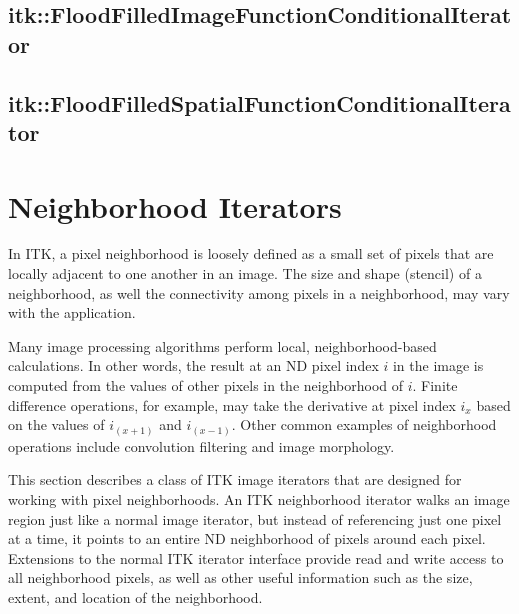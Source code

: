 \subsection{itk::FloodFilledImageFunctionConditionalIterator}
\label{itk::FloodFilledImageFunctionConditionalIterator}

\subsection{itk::FloodFilledSpatialFunctionConditionalIterator}
\label{itk::FloodFilledSpatialFunctionConditionalIterator}

\section{Neighborhood Iterators}
\label{sec:NeighborhoodIterators}
In ITK, a pixel neighborhood is loosely defined as a small set of pixels that
are locally adjacent to one another in an image.  The size and shape (stencil)
of a neighborhood, as well the connectivity among pixels in a neighborhood,
may vary with the application.

Many image processing algorithms perform local, neighborhood-based
calculations.  In other words, the result at an ND pixel index $i$ in the image
is computed from the values of other pixels in the neighborhood of $i$. Finite
difference operations, for example, may take the derivative at pixel index
$i_x$ based on the values of $i_(x+1)$ and $i_(x-1)$. Other common examples of
neighborhood operations include convolution filtering and image morphology.

This section describes a class of ITK image iterators that are designed for
working with pixel neighborhoods. An ITK neighborhood iterator walks an image
region just like a normal image iterator, but instead of referencing just one
pixel at a time, it points to an entire ND neighborhood of pixels around each
pixel. Extensions to the normal ITK iterator interface provide read and write
access to all neighborhood pixels, as well as other useful information
such as the size, extent, and location of the neighborhood.

